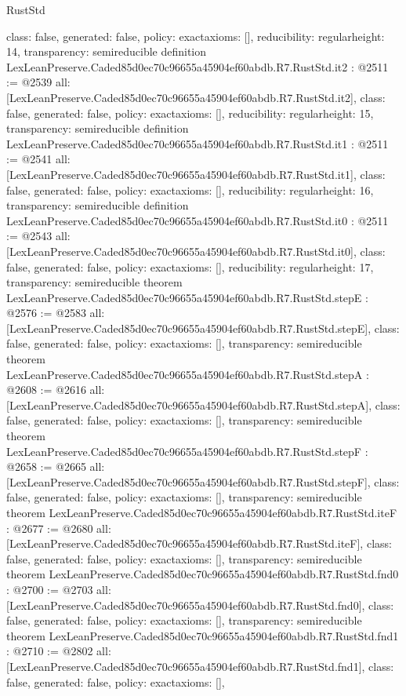 \begin{lexlean}{RustStd}
\begin{coremodule}
{  class: false,
  generated: false,
  policy: exact{axioms: []},
  reducibility: regular{height: 14},
  transparency: semireducible
}
definition LexLeanPreserve.Caded85d0ec70c96655a45904ef60abdb.R7.RustStd.it2 : @2511 := @2539 {
  all: [LexLeanPreserve.Caded85d0ec70c96655a45904ef60abdb.R7.RustStd.it2],
  class: false,
  generated: false,
  policy: exact{axioms: []},
  reducibility: regular{height: 15},
  transparency: semireducible
}
definition LexLeanPreserve.Caded85d0ec70c96655a45904ef60abdb.R7.RustStd.it1 : @2511 := @2541 {
  all: [LexLeanPreserve.Caded85d0ec70c96655a45904ef60abdb.R7.RustStd.it1],
  class: false,
  generated: false,
  policy: exact{axioms: []},
  reducibility: regular{height: 16},
  transparency: semireducible
}
definition LexLeanPreserve.Caded85d0ec70c96655a45904ef60abdb.R7.RustStd.it0 : @2511 := @2543 {
  all: [LexLeanPreserve.Caded85d0ec70c96655a45904ef60abdb.R7.RustStd.it0],
  class: false,
  generated: false,
  policy: exact{axioms: []},
  reducibility: regular{height: 17},
  transparency: semireducible
}
theorem LexLeanPreserve.Caded85d0ec70c96655a45904ef60abdb.R7.RustStd.stepE : @2576 := @2583 {
  all: [LexLeanPreserve.Caded85d0ec70c96655a45904ef60abdb.R7.RustStd.stepE],
  class: false,
  generated: false,
  policy: exact{axioms: []},
  transparency: semireducible
}
theorem LexLeanPreserve.Caded85d0ec70c96655a45904ef60abdb.R7.RustStd.stepA : @2608 := @2616 {
  all: [LexLeanPreserve.Caded85d0ec70c96655a45904ef60abdb.R7.RustStd.stepA],
  class: false,
  generated: false,
  policy: exact{axioms: []},
  transparency: semireducible
}
theorem LexLeanPreserve.Caded85d0ec70c96655a45904ef60abdb.R7.RustStd.stepF : @2658 := @2665 {
  all: [LexLeanPreserve.Caded85d0ec70c96655a45904ef60abdb.R7.RustStd.stepF],
  class: false,
  generated: false,
  policy: exact{axioms: []},
  transparency: semireducible
}
theorem LexLeanPreserve.Caded85d0ec70c96655a45904ef60abdb.R7.RustStd.iteF : @2677 := @2680 {
  all: [LexLeanPreserve.Caded85d0ec70c96655a45904ef60abdb.R7.RustStd.iteF],
  class: false,
  generated: false,
  policy: exact{axioms: []},
  transparency: semireducible
}
theorem LexLeanPreserve.Caded85d0ec70c96655a45904ef60abdb.R7.RustStd.fnd0 : @2700 := @2703 {
  all: [LexLeanPreserve.Caded85d0ec70c96655a45904ef60abdb.R7.RustStd.fnd0],
  class: false,
  generated: false,
  policy: exact{axioms: []},
  transparency: semireducible
}
theorem LexLeanPreserve.Caded85d0ec70c96655a45904ef60abdb.R7.RustStd.fnd1 : @2710 := @2802 {
  all: [LexLeanPreserve.Caded85d0ec70c96655a45904ef60abdb.R7.RustStd.fnd1],
  class: false,
  generated: false,
  policy: exact{axioms: []},
}
\end{coremodule}
\end{lexlean}
